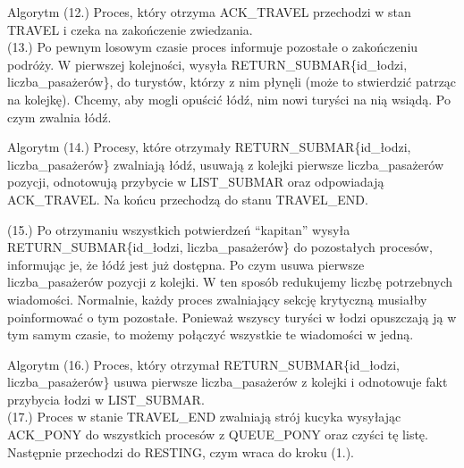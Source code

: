 \documentclass{beamer}
\begin{document}
\begin{frame}{Algorytm}
    \internallinenumbers
    (12.) Proces, który otrzyma ACK\_TRAVEL przechodzi w stan TRAVEL i czeka na zakończenie zwiedzania. \\

    (13.) Po pewnym losowym czasie proces informuje pozostałe o zakończeniu podróży. W pierwszej kolejności, wysyła RETURN\_SUBMAR\{id\_łodzi, liczba\_pasażerów\}, do turystów, którzy z nim płynęli (może to stwierdzić patrząc na kolejkę). Chcemy, aby mogli opuścić łódź, nim nowi turyści na nią wsiądą. Po czym zwalnia łódź.
\end{frame}

\begin{frame}{Algorytm}
    \internallinenumbers
    (14.) Procesy, które otrzymały RETURN\_SUBMAR\{id\_łodzi, liczba\_pasażerów\} zwalniają łódź, usuwają z kolejki pierwsze liczba\_pasażerów pozycji, odnotowują przybycie w LIST\_SUBMAR oraz odpowiadają ACK\_TRAVEL. Na końcu przechodzą do stanu TRAVEL\_END.

    (15.) Po otrzymaniu wszystkich potwierdzeń ``kapitan'' wysyła RETURN\_SUBMAR\{id\_łodzi, liczba\_pasażerów\} do pozostałych procesów, informując je, że łódź jest już dostępna. Po czym usuwa pierwsze liczba\_pasażerów pozycji z kolejki. W ten sposób redukujemy liczbę potrzebnych wiadomości. Normalnie, każdy proces zwalniający sekcję krytyczną musiałby poinformować o tym pozostałe. Ponieważ wszyscy turyści w łodzi opuszczają ją w tym samym czasie, to możemy połączyć wszystkie te wiadomości w jedną.
\end{frame}

\begin{frame}{Algorytm}
    \internallinenumbers
    (16.) Proces, który otrzymał RETURN\_SUBMAR\{id\_łodzi, liczba\_pasażerów\} usuwa pierwsze liczba\_pasażerów z kolejki i odnotowuje fakt przybycia łodzi w LIST\_SUBMAR.\\
    (17.) Proces w stanie TRAVEL\_END zwalniają strój kucyka wysyłając ACK\_PONY do wszystkich procesów z QUEUE\_PONY oraz czyści tę listę. Następnie przechodzi do RESTING, czym wraca do kroku (1.).
\end{frame}
\end{document}
